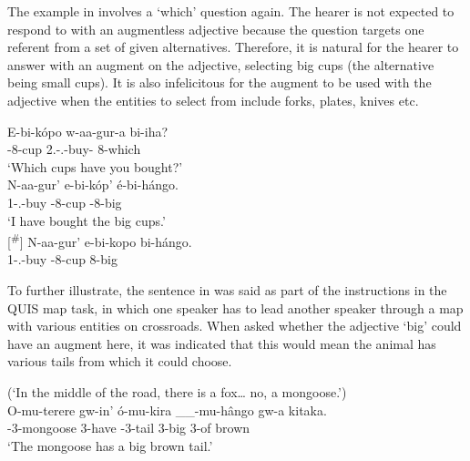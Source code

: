 \documentclass[output=paper]{langscibook}
\begin{document}
\z
\z

The example in  involves a ‘which’ question again. The hearer is not expected to respond to  with an augmentless adjective because the question targets one referent from a set of given alternatives. Therefore, it is natural for the hearer to answer with an augment on the adjective, selecting big cups (the alternative being small cups). It is also infelicitous for the augment to be used with the adjective when the entities to select from include forks, plates, knives etc.

\ea
\label{bkm:Ref111494149}\citep[1295]{AsiimweEtAl2023}
\ea
\label{bkm:Ref111494149:a}
\gll
E-bi-kópo  w-aa-gur-a  bi-iha?\\
\AUG{}-8-cup  2\SG{}.\SM{}-\N{}.\PST{}-buy-\FV{}  8-which\\
\glt
‘Which cups have you bought?’\\


\ex
\label{bkm:Ref111494149:b}
\gll
N-aa-gur’  e-bi-kóp’  é-bi-hángo.\\
1\SM{}-\N{}.\PST{}-buy  \AUG{}-8-cup  \AUG{}-8-big\\
\glt
‘I have bought the big cups.’\\

\ex
[\textsuperscript{\#}]{
\label{bkm:Ref111494149:c}   
\gll
N-aa-gur’  e-bi-kopo  bi-hángo.\\
1\SM{}-\N{}.\PST{}-buy  \AUG{}-{}8-cup  8-big\\
\glt
}

\z
\z

To further illustrate, the sentence in  was said as part of the instructions in the QUIS \citep{SkopeteasEtAl2006} map task, in which one speaker has to lead another speaker through a map with various entities on crossroads. When asked whether the adjective ‘big’ could have an augment here, it was indicated that this would mean the animal has various tails from which it could choose.

\ea
\label{bkm:Ref111466869}
(‘In the middle of the road, there is a fox… no, a mongoose.’)\\
\gll
O-mu-terere  gw-in’  ó-mu-kira  \_\_-mu-hângo  gw-a  kitaka.\\
\AUG{}-3-mongoose  3\SM{}-have  \AUG{}-3-tail  3-big  3-of  brown\\
\glt
`The mongoose has a big brown tail.’\\
\end{document}
